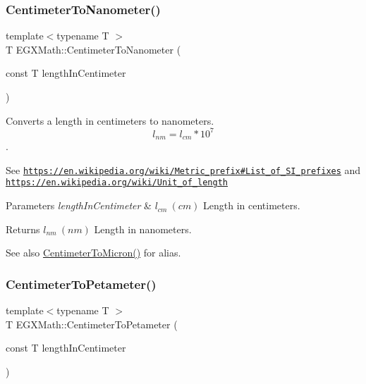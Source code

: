 \subsubsection{\texorpdfstring{Centimeter\+To\+Nanometer()}{CentimeterToNanometer()}}
{\footnotesize\ttfamily template$<$typename T $>$ \\
T E\+G\+X\+Math\+::\+Centimeter\+To\+Nanometer (\begin{DoxyParamCaption}\item[{const T}]{length\+In\+Centimeter }\end{DoxyParamCaption})}



Converts a length in centimeters to nanometers. \[ l_{nm}=l_{cm} * 10^{7} \]. 

See \href{https://en.wikipedia.org/wiki/Metric_prefix#List_of_SI_prefixes}{\tt https\+://en.\+wikipedia.\+org/wiki/\+Metric\+\_\+prefix\#\+List\+\_\+of\+\_\+\+S\+I\+\_\+prefixes} and \href{https://en.wikipedia.org/wiki/Unit_of_length}{\tt https\+://en.\+wikipedia.\+org/wiki/\+Unit\+\_\+of\+\_\+length} 
\begin{DoxyParams}{Parameters}
{\em length\+In\+Centimeter} & $ l_{cm}\ (cm)$ Length in centimeters. \\
\hline
\end{DoxyParams}
\begin{DoxyReturn}{Returns}
$ l_{nm}\ (nm)$ Length in nanometers. 
\end{DoxyReturn}
\begin{DoxySeeAlso}{See also}
\mbox{\hyperlink{group___e_g_x_math-_conversions-_length_conversions-_s_i-_centimeter-_non-_s_i_gaee509ac676e86ed54994792f82dab9f7}{Centimeter\+To\+Micron()}} for alias. 
\end{DoxySeeAlso}
\mbox{\label{group___e_g_x_math-_conversions-_length_conversions-_s_i-_centimeter-_s_i_ga8fa14e761d09dc55608c28c2101f2d26}} 
\subsubsection{\texorpdfstring{Centimeter\+To\+Petameter()}{CentimeterToPetameter()}}
{\footnotesize\ttfamily template$<$typename T $>$ \\
T E\+G\+X\+Math\+::\+Centimeter\+To\+Petameter (\begin{DoxyParamCaption}\item[{const T}]{length\+In\+Centimeter }\end{DoxyParamCaption})}



